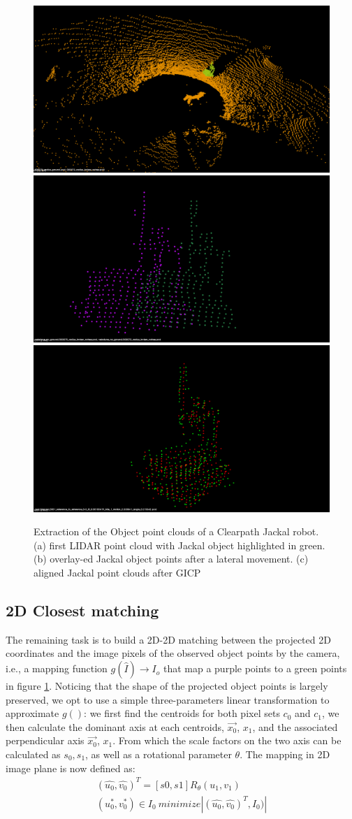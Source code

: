 \documentclass{article}
\begin{document}
\begin{figure}[]
    \centering
        \includegraphics[width=0.8\columnwidth]{images/000072_obj.png}
    \includegraphics[width=0.4\columnwidth]{images/obj_072_075.png}
    \includegraphics[width=0.4\columnwidth]{images/gicp_072_075.png}
    \caption{Extraction of the Object point clouds of a Clearpath Jackal robot. (a) first LIDAR point cloud with Jackal object highlighted in green. (b) overlay-ed Jackal object points after a lateral movement. (c) aligned Jackal point clouds after GICP}
    \label{fig:objext}
\end{figure} 

\subsection{2D Closest matching }
The remaining task is to build a 2D-2D matching between the projected 2D coordinates and the image pixels of the observed object points by the camera, i.e., a mapping function $g(\hat{I}) \rightarrow I_o$ that map a purple points to a green points in figure \ref{fig:objext}. Noticing that the shape of the projected object points is largely preserved,  
we opt to use a simple three-parameters linear transformation to approximate $g()$: we first find the centroids for both pixel sets $c_0$ and $c_1$, we then calculate the dominant axis at each centroids, $\overrightarrow{x_0}$, $x_1$, and the associated perpendicular axis $\overrightarrow{x_0}$, $x_1$. From which the scale factors on the two axis can be calculated as $s_0, s_1$, as well as a rotational parameter $\theta$. The mapping in 2D image plane is now defined as:
\begin{eqnarray}
(\hat{u_0}, \hat{v_0})^T = [s0, s1] R_{\theta} (u_1, v_1) \\
(u_0^*, v_0^*) \in I_0 ~ minimize |(\hat{u_0}, \hat{v_0})^T, I_0)|
\end{eqnarray}
\end{document}
